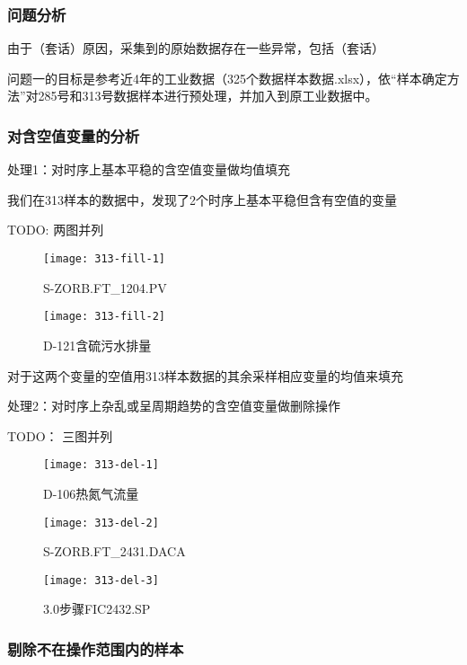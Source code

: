 \documentclass[bwprint]{gmcmthesis}
\begin{document}
\subsubsection{问题分析}

由于（套话）原因，采集到的原始数据存在一些异常，包括（套话）


问题一的目标是参考近4年的工业数据（325个数据样本数据.xlsx），依“样本确定方法”对285号和313号数据样本进行预处理，并加入到原工业数据中。

\subsubsection{对含空值变量的分析}

处理1：对时序上基本平稳的含空值变量做均值填充

我们在313样本的数据中，发现了2个时序上基本平稳但含有空值的变量

TODO: 两图并列


\begin{figure}[htbp]
	\centering
	\texttt{[image: 313-fill-1]}
	\caption{S-ZORB.FT\_1204.PV}
\end{figure}


\begin{figure}[htbp]
	\centering
	\texttt{[image: 313-fill-2]}
	\caption{D-121含硫污水排量}
\end{figure}

对于这两个变量的空值用313样本数据的其余采样相应变量的均值来填充

处理2：对时序上杂乱或呈周期趋势的含空值变量做删除操作

TODO： 三图并列


\begin{figure}[htbp]
	\centering
	\texttt{[image: 313-del-1]}
	\caption{D-106热氮气流量}
\end{figure}


\begin{figure}[htbp]
	\centering
	\texttt{[image: 313-del-2]}
	\caption{S-ZORB.FT\_2431.DACA}
\end{figure}


\begin{figure}[htbp]
	\centering
	\texttt{[image: 313-del-3]}
	\caption{3.0步骤FIC2432.SP}
\end{figure}



\subsubsection{剔除不在操作范围内的样本}
\end{document}
